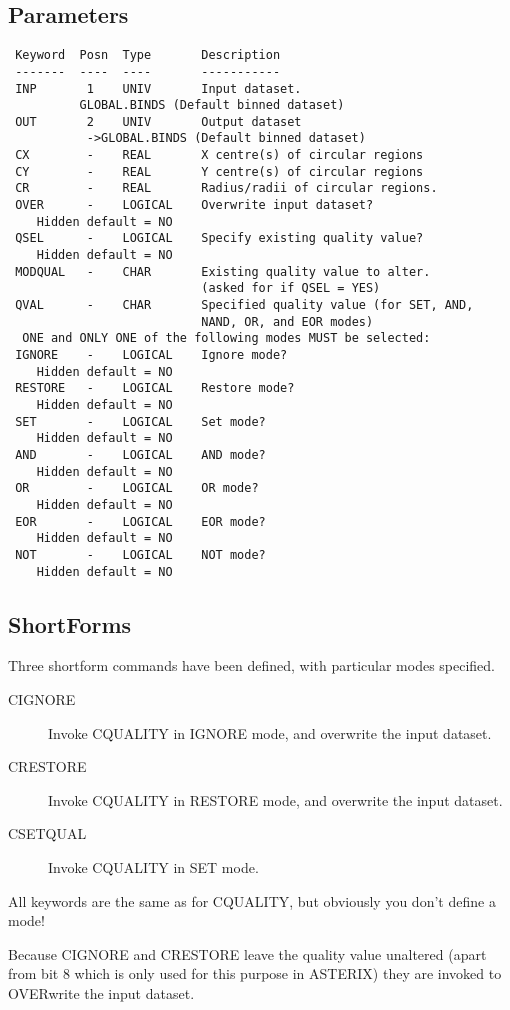\documentclass{book}
\renewcommand{\_}{{\tt\char'137}}     %
\begin{document}
\subsection{Parameters}
\begin{verbatim}
 Keyword  Posn  Type       Description
 -------  ----  ----       -----------
 INP       1    UNIV       Input dataset.
          GLOBAL.BINDS (Default binned dataset)
 OUT       2    UNIV       Output dataset
           ->GLOBAL.BINDS (Default binned dataset)
 CX        -    REAL       X centre(s) of circular regions
 CY        -    REAL       Y centre(s) of circular regions
 CR        -    REAL       Radius/radii of circular regions.
 OVER      -    LOGICAL    Overwrite input dataset?
    Hidden default = NO
 QSEL      -    LOGICAL    Specify existing quality value?
    Hidden default = NO
 MODQUAL   -    CHAR       Existing quality value to alter.
                           (asked for if QSEL = YES)
 QVAL      -    CHAR       Specified quality value (for SET, AND,
                           NAND, OR, and EOR modes)
  ONE and ONLY ONE of the following modes MUST be selected:
 IGNORE    -    LOGICAL    Ignore mode?
    Hidden default = NO
 RESTORE   -    LOGICAL    Restore mode?
    Hidden default = NO
 SET       -    LOGICAL    Set mode?
    Hidden default = NO
 AND       -    LOGICAL    AND mode?
    Hidden default = NO
 OR        -    LOGICAL    OR mode?
    Hidden default = NO
 EOR       -    LOGICAL    EOR mode?
    Hidden default = NO
 NOT       -    LOGICAL    NOT mode?
    Hidden default = NO

\end{verbatim}\subsection{ShortForms}
Three shortform commands have been defined, with particular
modes specified.

\begin{description}
\item[CIGNORE]
Invoke CQUALITY in IGNORE mode, and
overwrite the input dataset.
\item[CRESTORE]
Invoke CQUALITY in RESTORE mode, and
overwrite the input dataset.
\item[CSETQUAL]
Invoke CQUALITY in SET mode.
\end{description}
All keywords are the same as for CQUALITY, but obviously you don't
define a mode!

Because CIGNORE and CRESTORE leave the quality value unaltered (apart
from bit 8 which is only used for this purpose in ASTERIX) they are
invoked to OVERwrite the input dataset.
\end{document}
